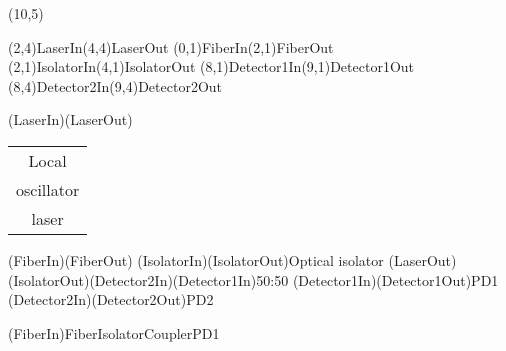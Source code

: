 \documentclass[pstricks]{standalone}
\begin{document}
	\begin{pspicture}(10,5)
		\begin{optexp}
			\pnodes(2,4){LaserIn}(4,4){LaserOut}
		  	\pnodes(0,1){FiberIn}(2,1){FiberOut}
		  	\pnodes(2,1){IsolatorIn}(4,1){IsolatorOut}
		  	\pnodes(8,1){Detector1In}(9,1){Detector1Out}
		  	\pnodes(8,4){Detector2In}(9,4){Detector2Out}

		  	\optbox[compname=Laser, position=start, optboxsize=2 1.4, labeloffset=0](LaserIn)(LaserOut){{\begin{tabular}{@{}c@{}}Local\\oscillator\\laser\end{tabular}}}
			\optfiber[compname=Fiber](FiberIn)(FiberOut)
			\optisolator[compname=Isolator](IsolatorIn)(IsolatorOut){Optical isolator}
			\optcoupler[compname=Coupler](LaserOut)(IsolatorOut)(Detector2In)(Detector1In){50:50}
			\optdetector[compname=PD1, dettype=diode, extnode=r](Detector1In)(Detector1Out){PD1}
			\optdetector[compname=PD2, dettype=diode, extnode=r](Detector2In)(Detector2Out){PD2}
		
			\drawfiber(FiberIn){Fiber}{Isolator}{Coupler}{PD1}
		\end{optexp}
	\end{pspicture}
\end{document}
